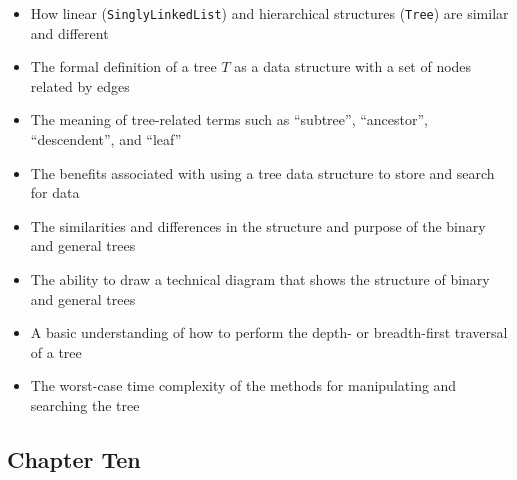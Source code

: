 \documentclass[11pt]{article}
\newcommand{\program}[1]{\lstinline{#1}}
\begin{document}
\begin{itemize}

  \item How linear (\program{SinglyLinkedList}) and hierarchical
    structures (\program{Tree}) are similar and different

  \item The formal definition of a tree $T$ as a data structure with a set of
    nodes related by edges

  \item The meaning of tree-related terms such as ``subtree'', ``ancestor'',
    ``descendent'', and ``leaf''

  \item The benefits associated with using a tree data structure to store and
    search for data

  \item The similarities and differences in the structure and purpose of the
    binary and general trees

  \item The ability to draw a technical diagram that shows the structure of
    binary and general trees

  \item A basic understanding of how to perform the depth- or breadth-first
    traversal of a tree

  \item The worst-case time complexity of the methods for manipulating and
    searching the tree

\end{itemize}

\vspace*{-.2in}
\subsection*{Chapter Ten}
\end{document}
